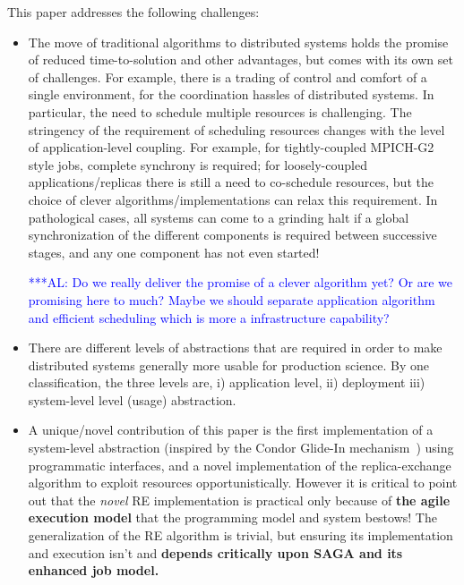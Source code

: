 \documentclass{rspublic}
\newcommand{\alnote}[1]{ {\textcolor{blue} { ***AL: #1 }}}
\newcommand{\alnote}[1]{}
\begin{document}
This paper addresses the following challenges:                 
\begin{itemize}

\item The move of traditional algorithms to distributed systems holds
  the promise of reduced time-to-solution and other advantages, but
  comes with its own set of challenges. For example, there is a
  trading of control and comfort of a single environment, for the
  coordination hassles of distributed systems. In particular, the need
  to schedule multiple resources is challenging. The stringency of the
  requirement of scheduling resources changes with the level of
  application-level coupling. For example, for tightly-coupled
  MPICH-G2 style jobs, complete synchrony is required; for
  loosely-coupled applications/replicas there is still a need to
  co-schedule resources, but the choice of clever
  algorithms/implementations can relax this requirement. In
  pathological cases, all systems can come to a grinding halt if a
  global synchronization of the different components is required
  between successive stages, and any one component has not even
  started!  
  
  \alnote{Do we really deliver the promise of a clever algorithm yet? Or are we
  promising here to much? Maybe we should separate application algorithm and efficient
  scheduling which is more a infrastructure capability?}

\item There are different levels of abstractions  that are required
  in order to make distributed systems generally more usable for
  production science. By one classification, the three levels are, 
  i) application level, ii) deployment iii) system-level
  level (usage) abstraction.

\item A unique/novel contribution of this paper is the first
  implementation of a system-level abstraction (inspired by the Condor 
  Glide-In mechanism~\citep{citeulike:291860})
  using programmatic interfaces, and a novel implementation of the
  replica-exchange algorithm to exploit resources opportunistically.
  However it is critical to point out that the {\it novel} RE
  implementation is practical only because of {\bf the agile execution
  model} that the programming model and system bestows! The
  generalization of the RE algorithm is trivial, but ensuring its
  implementation and execution isn't and {\bf depends critically upon
    SAGA and its enhanced job model.}


\end{itemize}
          
\end{document}
